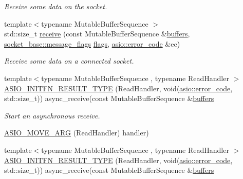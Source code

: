 \begin{DoxyCompactItemize}
\begin{DoxyCompactList}\small\item\em Receive some data on the socket. \end{DoxyCompactList}\item 
{\footnotesize template$<$typename Mutable\+Buffer\+Sequence $>$ }\\std\+::size\+\_\+t \hyperlink{classasio_1_1basic__stream__socket_ac973f4905e256cf6fde6f9a61b704464}{receive} (const Mutable\+Buffer\+Sequence \&\hyperlink{group__async__read_ga54dede45c3175148a77fe6635222c47d}{buffers}, \hyperlink{classasio_1_1socket__base_ac3cf77465dfedfe1979b5415cf32cc94}{socket\+\_\+base\+::message\+\_\+flags} \hyperlink{classasio_1_1basic__stream__socket_a49da9b10ef73407f4991c633ced27111}{flags}, \hyperlink{classasio_1_1error__code}{asio\+::error\+\_\+code} \&ec)
\begin{DoxyCompactList}\small\item\em Receive some data on a connected socket. \end{DoxyCompactList}\item 
{\footnotesize template$<$typename Mutable\+Buffer\+Sequence , typename Read\+Handler $>$ }\\\hyperlink{classasio_1_1basic__stream__socket_a88f965bd1ab0af8e56afa67891c412d2}{A\+S\+I\+O\+\_\+\+I\+N\+I\+T\+F\+N\+\_\+\+R\+E\+S\+U\+L\+T\+\_\+\+T\+Y\+P\+E} (Read\+Handler, void(\hyperlink{classasio_1_1error__code}{asio\+::error\+\_\+code}, std\+::size\+\_\+t)) async\+\_\+receive(const Mutable\+Buffer\+Sequence \&\hyperlink{group__async__read_ga54dede45c3175148a77fe6635222c47d}{buffers}
\begin{DoxyCompactList}\small\item\em Start an asynchronous receive. \end{DoxyCompactList}\item 
\hyperlink{classasio_1_1basic__stream__socket_ab4d3d3c54c32d560b4a3b7e8df39a1c3}{A\+S\+I\+O\+\_\+\+M\+O\+V\+E\+\_\+\+A\+R\+G} (Read\+Handler) handler)
\item 
{\footnotesize template$<$typename Mutable\+Buffer\+Sequence , typename Read\+Handler $>$ }\\\hyperlink{classasio_1_1basic__stream__socket_a88f965bd1ab0af8e56afa67891c412d2}{A\+S\+I\+O\+\_\+\+I\+N\+I\+T\+F\+N\+\_\+\+R\+E\+S\+U\+L\+T\+\_\+\+T\+Y\+P\+E} (Read\+Handler, void(\hyperlink{classasio_1_1error__code}{asio\+::error\+\_\+code}, std\+::size\+\_\+t)) async\+\_\+receive(const Mutable\+Buffer\+Sequence \&\hyperlink{group__async__read_ga54dede45c3175148a77fe6635222c47d}{buffers}

\end{DoxyCompactItemize}
